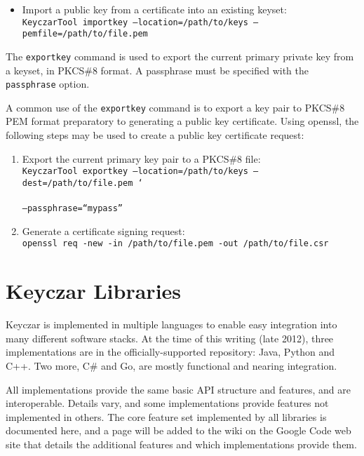 \documentclass{llncs}
\begin{document}
\begin{itemize}
\item Import a public key from a certificate into an existing keyset:\\
{\tt KeyczarTool importkey --location=/path/to/keys --pemfile=/path/to/file.pem}
\end{itemize}

The {\tt exportkey} command is used to export the current primary
private key from a keyset, in PKCS\#8 format.  A passphrase must be
specified with the {\tt passphrase} option.

A common use of the {\tt exportkey} command is to export a key pair to
PKCS\#8 PEM format preparatory to generating a public key certificate.
Using openssl, the following steps may be used to create a public key
certificate request:

\begin{enumerate}
  
\item Export the current primary key pair to a PKCS\#8 file:\\
  {\tt KeyczarTool exportkey --location=/path/to/keys
    --dest=/path/to/file.pem \texttt{\char`\\} \\
    --passphrase=``mypass''}
    
\item Generate a certificate signing request:\\
  {\tt openssl req -new -in /path/to/file.pem -out /path/to/file.csr}
  
\end{enumerate}

\section{Keyczar Libraries}

Keyczar is implemented in multiple languages to enable easy
integration into many different software stacks.  At the time of this
writing (late 2012), three implementations are in the
officially-supported repository:  Java, Python and C++.  Two more, C\#
and Go, are mostly functional and nearing integration.

All implementations provide the same basic API structure and features,
and are interoperable.  Details vary, and some implementations provide
features not implemented in others.  The core feature set implemented
by all libraries is documented here, and a page will be added to the
wiki on the Google Code web site that details the additional features
and which implementations provide them.
\end{document}
